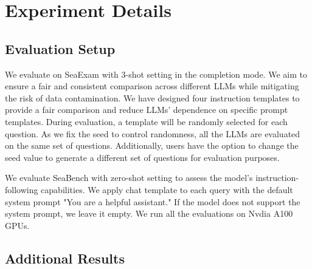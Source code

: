 \section{Experiment Details} \label{app:exp_details}

\subsection{Evaluation Setup} \label{app:eval_setup}
We evaluate on SeaExam with 3-shot setting in the completion mode. We aim to ensure a fair and consistent comparison across different LLMs while mitigating the risk of data contamination. We have designed four instruction templates to provide a fair comparison and reduce LLMs' dependence on specific prompt templates. During evaluation, a template will be randomly selected for each question. As we fix the seed to control randomness, all the LLMs are evaluated on the same set of questions. Additionally, users have the option to change the seed value to generate a different set of questions for evaluation purposes.

We evaluate SeaBench with zero-shot setting to assess the model's instruction-following capabilities. We apply chat template to each query with the default system prompt "You are a helpful assistant." If the model does not support the system prompt, we leave it empty. We run all the evaluations on Nvdia A100 GPUs.

\subsection{Additional Results}







